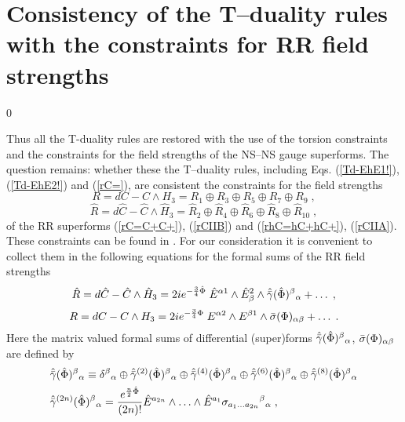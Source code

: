 \documentclass[a4paper,11pt]{article}
\begin{document}
\section{Consistency of the T--duality rules with the constraints for 
RR field strengths} 
\setcounter{equation}0

Thus all the T-duality rules are restored with the use 
of the torsion constraints and the constraints for the field strengths 
of the NS--NS gauge superforms. The question remains: whether these  
 the T--duality rules, including 
Eqs. (\ref{Td-EhE1!}), (\ref{Td-EhE2!}) and (\ref{rC=}), 
 are consistent the constraints 
for the field strengths 
\begin{equation}\label{R=R+R+}
R=dC - C \wedge H_3 = 
R_1 \oplus R_3 \oplus R_5  \oplus R_7  \oplus R_9  \; , 
\end{equation}
\begin{equation}\label{hR=hR+hR+}
\hat{R}=d\hat{C} - \hat{C} \wedge \hat{H}_3 = 
\hat{R}_2 \oplus \hat{R}_4 \oplus \hat{R}_6  \oplus \hat{R}_8  \oplus 
\hat{R}_{10} \; ,  
\end{equation}
of the RR superforms (\ref{rC=C+C+}), (\ref{rCIIB}) and 
(\ref{rhC=hC+hC+}), (\ref{rCIIA}). 
These constraints can be found in \cite{c0}. 
For our consideration it is convenient to collect them 
in the following equations for the formal sums of the 
RR field strengths
\begin{equation}\label{hR=hc}
\hat{R}=d\hat{C} - \hat{C} \wedge \hat{H}_3 = 
 2i e^{-{3\over 4}\hat{\Phi}} \; 
\hat{E}^{ {\alpha}1}
\wedge
\hat{E}^2_{ {\beta}}
\wedge \hat{\bar\gamma}(\hat{\Phi})^{ {\beta}}{}_{ {\alpha}}
  + \ldots \;   ,
\end{equation}
\begin{equation}\label{R=c} 
R=dC - C \wedge H_3 = 
2i e^{-{3\over 4}{\Phi}} \; 
{E}^{ {\alpha}2}
\wedge
{E}^{ {\beta}1}
\wedge \bar{\sigma}({\Phi})_{ {\alpha} {\beta}}
   + \ldots \;   .  
\end{equation}
Here the matrix valued formal sums of differential (super)forms 
$\hat{\bar\gamma}(\hat{\Phi}){}^{ {\beta}}{}_{ {\alpha}}$, 
$\bar{\sigma}({\Phi})_{ {\alpha} {\beta}}$ are defined by 
\begin{eqnarray}\label{hg=sum}
& \hat{\bar\gamma}(\hat{\Phi}){}^{ {\beta}}{}_{ {\alpha}}
\equiv \delta^{ {\beta}} {}_{ {\alpha}}
\oplus \hat{\bar\gamma}^{(2)}(\hat{\Phi})^{ {\beta}}{}_{ {\alpha}}
\oplus \hat{\bar\gamma}^{(4)}(\hat{\Phi})^{ {\beta}}{}_{ {\alpha}}
\oplus \hat{\bar\gamma}^{(6)}(\hat{\Phi})^{ {\beta}}{}_{ {\alpha}}
\oplus \hat{\bar\gamma}^{(8)}(\hat{\Phi})^{ {\beta}}{}_{ {\alpha}}
\\ & \label{hg2n}
\hat{\bar\gamma}^{(2n)}(\hat{\Phi})^{ {\beta}}{}_{ {\alpha}}
= {e^{{n\over 2}\hat{\Phi} }\over (2n)!} 
\hat{E}^{ {a}_{2n}}
\wedge \ldots \wedge \hat{E}^{ {a}_{1}}
\sigma_{ {a}_{1} \ldots {a}_{2n}}
{}^{ {\beta}}{}_{ {\alpha}}\; , 
\end{eqnarray}
\end{document}

